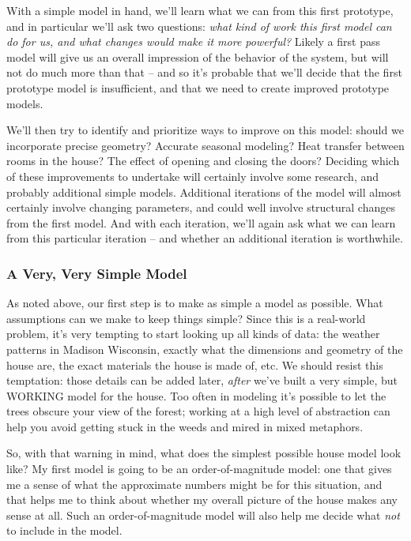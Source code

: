 \documentclass[10pt]{book}
\begin{document}
With a simple model in hand, we'll learn what we can from this first prototype, and in particular we'll ask two questions: {\it what kind of work this first model can do for us, and what changes would make it more powerful?}  Likely a first pass model will give us an overall impression of the behavior of the system, but will not do much more than that -- and so it's probable that we'll decide that the first prototype model is insufficient, and that we need to create improved  prototype models.   

We'll then try to identify and prioritize ways to improve on this model: should we incorporate precise geometry?  Accurate seasonal modeling?  Heat transfer between rooms in the house?  The effect of opening and closing the doors?  Deciding which of these improvements to undertake will certainly involve some research, and probably additional simple models. Additional iterations of the model will almost certainly  involve changing parameters, and could well involve structural changes from the first model.  And with each iteration, we'll again ask what we can learn from this particular iteration -- and whether an additional iteration is worthwhile.

\subsubsection{A Very, Very Simple Model}

As noted above, our first step is to make as simple a model as possible. What assumptions can we make to keep things simple?  Since this is a real-world problem, it's very tempting to start looking up all kinds of data:  the weather patterns in Madison Wisconsin, exactly what the dimensions and geometry of the house are, the exact materials the house is made of, etc.   We should resist this temptation:  those details can be added later, {\it after} we've built a very simple, but WORKING model for the house.  Too often in modeling it's possible to let the trees obscure your view of the forest; working at a high level of abstraction can help you avoid getting stuck in the weeds and mired in mixed metaphors.

So, with that warning in mind, what does the simplest possible house model look like?  My first model is going to be an order-of-magnitude model: one that gives me a sense of what the approximate numbers might be for this situation, and that helps me to think about whether my overall picture of the house makes any sense at all.   Such an order-of-magnitude model will also help me decide what {\it not} to include in the model.
\end{document}
